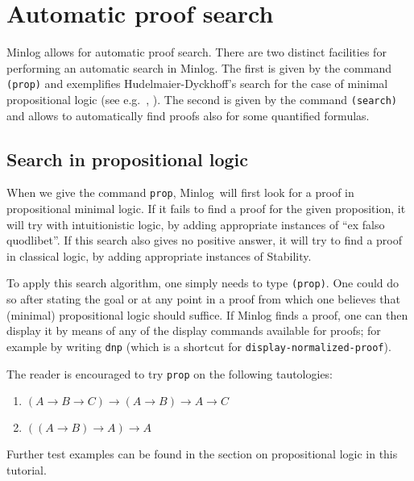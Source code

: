 \documentclass[12pt]{amsart}
\newcommand{\inquotes}[1]{``#1''}
\newcommand{\mi}{Minlog}
\begin{document}
\section{Automatic proof search}
Minlog allows for automatic proof search.  There are two distinct
facilities for performing an automatic search in Minlog.  The first is
given by the command \texttt{(prop)} and exemplifies
Hudelmaier-Dyckhoff's search for the case of minimal propositional
logic (see e.g.\ \cite{Hudelmaier89}, \cite{Dyckhoff92}).  The second
is given by the command \texttt{(search)} and allows to automatically
find proofs also for some quantified formulas.

\subsection{Search in propositional logic}
When we give the command \texttt{prop}, \mi\ will first look for a
proof in propositional minimal logic.  If it fails to find a proof for
the given proposition, it will try with intuitionistic logic, by
adding appropriate instances of \inquotes{ex falso quodlibet}.  If
this search also gives no positive answer, it will try to find a proof
in classical logic, by adding appropriate instances of Stability.

To apply this search algorithm, one simply needs to type
\texttt{(prop)}. One could do so after stating the goal or at any
point in a proof from which one believes that (minimal) propositional
logic should suffice.  If Minlog finds a proof, one can then
display it by means of any of the display commands available for
proofs; for example by writing \texttt{dnp} (which is a shortcut for
\texttt{display-normalized-proof}).

The reader is encouraged to try \texttt{prop} on
the following tautologies:
\begin{enumerate}
\item $(A \to B \to C) \to (A \to B) \to A \to C$
\item $((A \to B) \to A) \to A$
\end{enumerate}

Further test examples can be found in the section on
propositional logic in this tutorial.
\end{document}
